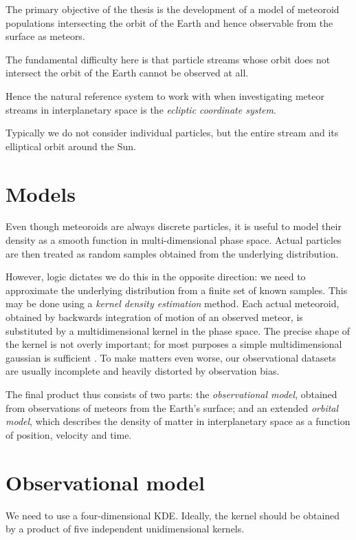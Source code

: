 The primary objective of the thesis is the development of a model of meteoroid populations
intersecting the orbit of the Earth and hence observable from the surface as meteors.





The fundamental difficulty here is that particle streams whose orbit does not intersect the orbit of the Earth
cannot be observed at all.

Hence the natural reference system to work with when investigating meteor streams in interplanetary space
is the \emph{ecliptic coordinate system}.



Typically we do not consider individual particles, but the entire stream and its elliptical orbit around the Sun.

\section{Models}
    Even though meteoroids are always discrete particles, it is useful to model their density
    as a smooth function in multi-dimensional phase space.
    Actual particles are then treated as random samples obtained from the underlying distribution.

    However, logic dictates we do this in the opposite direction: we need to approximate
    the underlying distribution from a finite set of known samples.
    This may be done using a \emph{kernel density estimation} method.
    Each actual meteoroid, obtained by backwards integration of motion of an observed meteor,
    is substituted by a multidimensional kernel in the phase space. The precise shape of the kernel
    is not overly important; for most purposes a simple multidimensional gaussian is sufficient \cite{...}.
    To make matters even worse, our observational datasets are usually incomplete
    and heavily distorted by observation bias.

    The final product thus consists of two parts: the \emph{observational model},
    obtained from observations of meteors from the Earth's surface;
    and an extended \emph{orbital model}, which describes the density of matter
    in interplanetary space as a function of position, velocity and time.

\section{Observational model} \label{io}
    We need to use a four-dimensional KDE. Ideally, the kernel should be obtained by a product of five
    independent unidimensional kernels.

